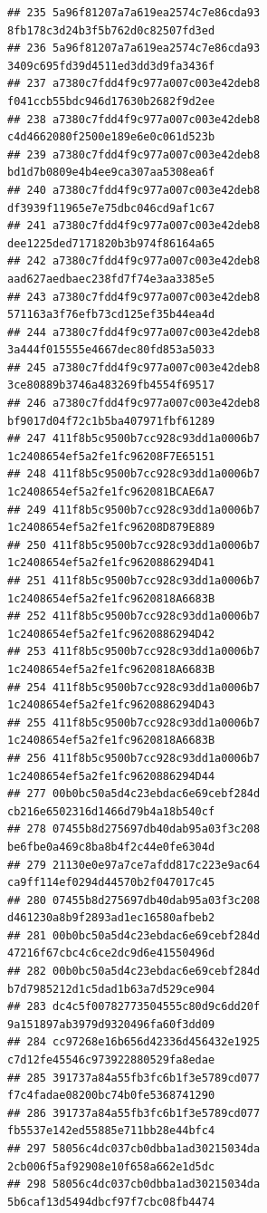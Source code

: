 \documentclass[]{article}
\begin{document}
\begin{verbatim}
## 235 5a96f81207a7a619ea2574c7e86cda93     8fb178c3d24b3f5b762d0c82507fd3ed
## 236 5a96f81207a7a619ea2574c7e86cda93     3409c695fd39d4511ed3dd3d9fa3436f
## 237 a7380c7fdd4f9c977a007c003e42deb8     f041ccb55bdc946d17630b2682f9d2ee
## 238 a7380c7fdd4f9c977a007c003e42deb8     c4d4662080f2500e189e6e0c061d523b
## 239 a7380c7fdd4f9c977a007c003e42deb8     bd1d7b0809e4b4ee9ca307aa5308ea6f
## 240 a7380c7fdd4f9c977a007c003e42deb8     df3939f11965e7e75dbc046cd9af1c67
## 241 a7380c7fdd4f9c977a007c003e42deb8     dee1225ded7171820b3b974f86164a65
## 242 a7380c7fdd4f9c977a007c003e42deb8     aad627aedbaec238fd7f74e3aa3385e5
## 243 a7380c7fdd4f9c977a007c003e42deb8     571163a3f76efb73cd125ef35b44ea4d
## 244 a7380c7fdd4f9c977a007c003e42deb8     3a444f015555e4667dec80fd853a5033
## 245 a7380c7fdd4f9c977a007c003e42deb8     3ce80889b3746a483269fb4554f69517
## 246 a7380c7fdd4f9c977a007c003e42deb8     bf9017d04f72c1b5ba407971fbf61289
## 247 411f8b5c9500b7cc928c93dd1a0006b7     1c2408654ef5a2fe1fc96208F7E65151
## 248 411f8b5c9500b7cc928c93dd1a0006b7     1c2408654ef5a2fe1fc962081BCAE6A7
## 249 411f8b5c9500b7cc928c93dd1a0006b7     1c2408654ef5a2fe1fc96208D879E889
## 250 411f8b5c9500b7cc928c93dd1a0006b7     1c2408654ef5a2fe1fc9620886294D41
## 251 411f8b5c9500b7cc928c93dd1a0006b7     1c2408654ef5a2fe1fc9620818A6683B
## 252 411f8b5c9500b7cc928c93dd1a0006b7     1c2408654ef5a2fe1fc9620886294D42
## 253 411f8b5c9500b7cc928c93dd1a0006b7     1c2408654ef5a2fe1fc9620818A6683B
## 254 411f8b5c9500b7cc928c93dd1a0006b7     1c2408654ef5a2fe1fc9620886294D43
## 255 411f8b5c9500b7cc928c93dd1a0006b7     1c2408654ef5a2fe1fc9620818A6683B
## 256 411f8b5c9500b7cc928c93dd1a0006b7     1c2408654ef5a2fe1fc9620886294D44
## 277 00b0bc50a5d4c23ebdac6e69cebf284d     cb216e6502316d1466d79b4a18b540cf
## 278 07455b8d275697db40dab95a03f3c208     be6fbe0a469c8ba8b4f2c44e0fe6304d
## 279 21130e0e97a7ce7afdd817c223e9ac64     ca9ff114ef0294d44570b2f047017c45
## 280 07455b8d275697db40dab95a03f3c208     d461230a8b9f2893ad1ec16580afbeb2
## 281 00b0bc50a5d4c23ebdac6e69cebf284d     47216f67cbc4c6ce2dc9d6e41550496d
## 282 00b0bc50a5d4c23ebdac6e69cebf284d     b7d7985212d1c5dad1b63a7d529ce904
## 283 dc4c5f00782773504555c80d9c6dd20f     9a151897ab3979d9320496fa60f3dd09
## 284 cc97268e16b656d42336d456432e1925     c7d12fe45546c973922880529fa8edae
## 285 391737a84a55fb3fc6b1f3e5789cd077     f7c4fadae08200bc74b0fe5368741290
## 286 391737a84a55fb3fc6b1f3e5789cd077     fb5537e142ed55885e711bb28e44bfc4
## 297 58056c4dc037cb0dbba1ad30215034da     2cb006f5af92908e10f658a662e1d5dc
## 298 58056c4dc037cb0dbba1ad30215034da     5b6caf13d5494dbcf97f7cbc08fb4474

\end{verbatim}
\end{document}
